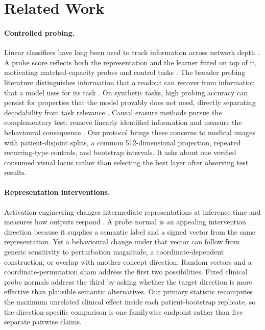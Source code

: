 \section{Related Work}
\label{sec:related}

\paragraph{Controlled probing.}
Linear classifiers have long been used to track information across network depth \citep{alain2017understanding}. A probe score reflects both the representation and the learner fitted on top of it, motivating matched-capacity probes and control tasks \citep{hewitt2019designing}. The broader probing literature distinguishes information that a readout can recover from information that a model uses for its task \citep{belinkov2022probing}. On synthetic tasks, high probing accuracy can persist for properties that the model provably does not need, directly separating decodability from task relevance \citep{ravichander2021probing}. Causal erasure methods pursue the complementary test: remove linearly identified information and measure the behavioural consequence \citep{ravfogel2020null,elazar2021amnesic}. Our protocol brings these concerns to medical images with patient-disjoint splits, a common 512-dimensional projection, repeated recurring-type controls, and bootstrap intervals. It asks about one verified consumed visual locus rather than selecting the best layer after observing test results.

\paragraph{Representation interventions.}
Activation engineering changes intermediate representations at inference time and measures how outputs respond \citep{turner2023steering,panickssery2024caa}. A probe normal is an appealing intervention direction because it supplies a semantic label and a signed vector from the same representation. Yet a behavioural change under that vector can follow from generic sensitivity to perturbation magnitude, a coordinate-dependent construction, or overlap with another concept direction. Random vectors and a coordinate-permutation sham address the first two possibilities. Fixed clinical probe normals address the third by asking whether the target direction is more effective than plausible semantic alternatives. Our primary statistic recomputes the maximum unrelated clinical effect inside each patient-bootstrap replicate, so the direction-specific comparison is one familywise endpoint rather than five separate pairwise claims.

